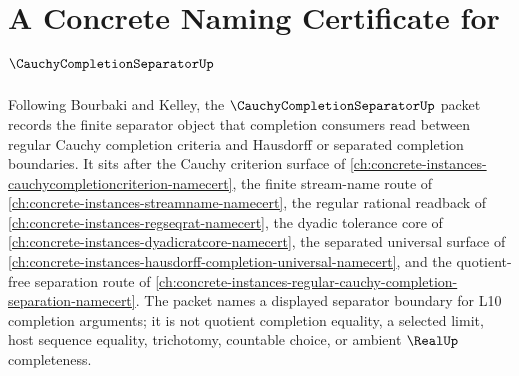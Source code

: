 \chapter{A Concrete Naming Certificate for $\CauchyCompletionSeparatorUp$}
\label{ch:concrete-instances-cauchy-completion-separator-namecert}

Following Bourbaki and Kelley, the $\CauchyCompletionSeparatorUp$ packet records the finite separator object that completion consumers read between regular Cauchy completion criteria and Hausdorff or separated completion boundaries. It sits after the Cauchy criterion surface of \autoref{ch:concrete-instances-cauchycompletioncriterion-namecert}, the finite stream-name route of \autoref{ch:concrete-instances-streamname-namecert}, the regular rational readback of \autoref{ch:concrete-instances-regseqrat-namecert}, the dyadic tolerance core of \autoref{ch:concrete-instances-dyadicratcore-namecert}, the separated universal surface of \autoref{ch:concrete-instances-hausdorff-completion-universal-namecert}, and the quotient-free separation route of \autoref{ch:concrete-instances-regular-cauchy-completion-separation-namecert}. The packet names a displayed separator boundary for L10 completion arguments; it is not quotient completion equality, a selected limit, host sequence equality, trichotomy, countable choice, or ambient $\RealUp$ completeness.

